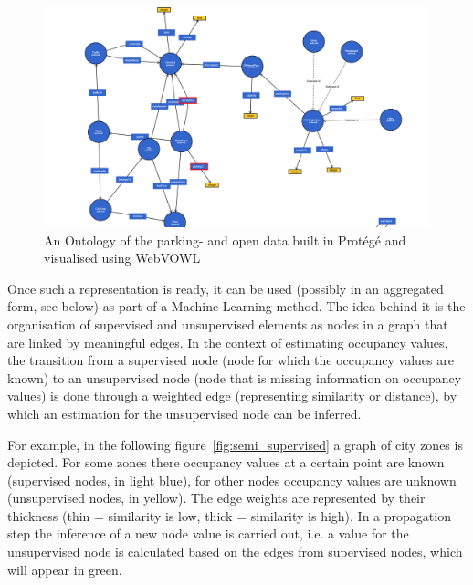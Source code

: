 \documentclass{article}
\begin{document}
\begin{large}
\begin{enumerate}
\begin{figure}[!ht]
    \centering
    \includegraphics[width=\textwidth]{ontology.png}
    \caption{An Ontology of the parking- and open data built in Protégé and visualised using WebVOWL}
    \label{fig:ontology}
\end{figure}

Once such a representation is ready, it can be used (possibly in an aggregated form, see below) as part of a Machine Learning method. The idea behind it is the organisation of supervised and unsupervised elements as nodes in a graph that are linked by meaningful edges. In the context of estimating occupancy values, the transition from a supervised node (node for which the occupancy values are known) to an unsupervised node (node that is missing information on occupancy values) is done through a weighted edge (representing similarity or distance), by which an estimation for the unsupervised node can be inferred.

For example, in the following figure~\ref{fig:semi_supervised} a graph of city zones is depicted. For some zones there occupancy values at a certain point are known (supervised nodes, in light blue), for other nodes occupancy values are unknown (unsupervised nodes, in yellow). The edge weights are represented by their thickness (thin = similarity is low, thick = similarity is high). In a propagation step the inference of a new node value is carried out, i.e. a value for the unsupervised node is calculated based on the edges from supervised nodes, which will appear in green. 


\end{enumerate}
\end{large}
\end{document}
